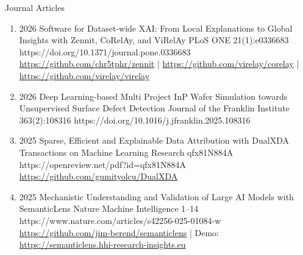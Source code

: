 \headedsubsection %
{Journal Articles}{ }
{
\begin{enumerate}

    \item {}
                        {2026}
                        {Software for Dataset-wide XAI: From Local Explanations to Global Insights with Zennit, CoRelAy, and ViRelAy}
                        {PLoS ONE}
                        {21(1):e0336683}
                        {https://doi.org/10.1371/journal.pone.0336683}
                        {   \\
                            \href{https://github.com/chr5tphr/zennit}{https://github.com/chr5tphr/zennit} |
                            \href{https://github.com/virelay/corelay}{https://github.com/virelay/corelay} |
                            \href{https://github.com/virelay/virelay}{https://github.com/virelay/virelay}
                        }

    \item {}
                        {2026}
                        {Deep Learning-based Multi Project InP Wafer Simulation towards Unsupervised Surface Defect Detection}
                        {Journal of the Franklin Institute}
                        {363(2):108316}
                        {https://doi.org/10.1016/j.jfranklin.2025.108316}

    \item {}
                        {2025}
                        {Sparse, Efficient and Explainable Data Attribution with DualXDA}
                        {Transactions on Machine Learning Research}
                        {qfx81N884A}
                        {https://openreview.net/pdf?id=qfx81N884A}
                        {\\\href{https://github.com/gumityolcu/DualXDA}{https://github.com/gumityolcu/DualXDA}}
                        

    \item {}
                        {2025}
                        {Mechanistic Understanding and Validation of Large AI Models with SemanticLens}
                        {Nature Machine Intelligence}
                        {1--14}
                        {https://www.nature.com/articles/s42256-025-01084-w}
                        {   
                            \\\href{https://github.com/jim-berend/semanticlens}{https://github.com/jim-berend/semanticlens} | Demo: \href{https://semanticlens.hhi-research-insights.eu}{https://semanticlens.hhi-research-insights.eu}
                        }
                     

\end{enumerate}}
